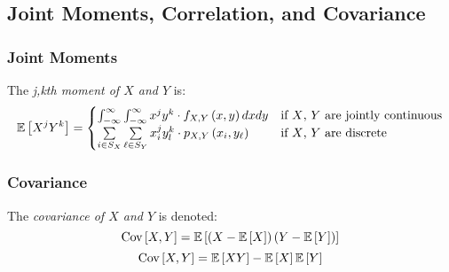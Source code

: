 	\subsection{Joint Moments, Correlation, and Covariance} \label{subsec:Joint Moments, Correlation, and Covariance}
		\subsubsection{Joint Moments} \label{subsubsec:Joint Moments}
			\begin{definition} \label{def:jkth Moment}
				The \emph{j,kth moment of $X$ and $Y$} is:
				\begin{equation} \label{eq:jkth Moment}
					\operatorname{\mathbb{E}} \left[ X^{j} Y^{k} \right] =
					\begin{cases}
						\int_{-\infty}^{\infty} \int_{-\infty}^{\infty} x^{j} y^{k} \cdot f_{X,Y} \left( x,y \right) dx dy &
							\text{if $X$, $Y$ are jointly continuous} \\
						\sum\limits_{i \in S_{X}} \sum\limits_{\ell \in S_{Y}} x_{i}^{j} y_{l}^{k} \cdot p_{X,Y} \left( x_{i},y_{\ell} \right) & 
							\text{if $X$, $Y$ are discrete} \\
					\end{cases}
				\end{equation}
			\end{definition} 
		
		\subsubsection{Covariance} \label{subsubsec:Covariance}
			\begin{definition}[Covariance] \label{def:Covariance}
				The \emph{covariance of $X$ and $Y$} is denoted:
				\begin{equation} \label{eq:Covariance, Form 1}
					\text{Cov} \left[ X,Y \right] = \operatorname{\mathbb{E}} \left[ \left( X - \operatorname{\mathbb{E}} \left[ X \right] \right) \left( Y - \operatorname{\mathbb{E}} \left[ Y \right] \right)\right]
				\end{equation}
				\begin{equation} \label{eq:Covariance, Form 2}
					\text{Cov} \left[ X,Y \right] = \operatorname{\mathbb{E}} \left[ XY \right] - \operatorname{\mathbb{E}} \left[ X \right] \operatorname{\mathbb{E}} \left[ Y \right]
				\end{equation}
			\end{definition}
		
